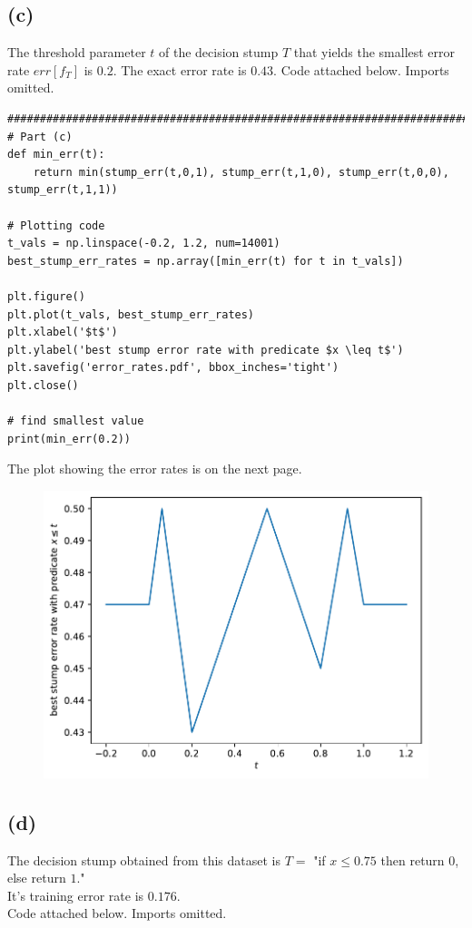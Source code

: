 \documentclass[11pt]{article}
\begin{document}
\subsection*{(c)}
The threshold parameter $t$ of the decision stump $T$ that yields the smallest error rate $err[f_T]$ is $0.2$. The exact error rate is $0.43$. Code attached below. Imports omitted.
\begin{verbatim}
################################################################################
# Part (c)
def min_err(t):
    return min(stump_err(t,0,1), stump_err(t,1,0), stump_err(t,0,0), stump_err(t,1,1))

# Plotting code
t_vals = np.linspace(-0.2, 1.2, num=14001)
best_stump_err_rates = np.array([min_err(t) for t in t_vals])

plt.figure()
plt.plot(t_vals, best_stump_err_rates)
plt.xlabel('$t$')
plt.ylabel('best stump error rate with predicate $x \leq t$')
plt.savefig('error_rates.pdf', bbox_inches='tight')
plt.close()

# find smallest value
print(min_err(0.2))
\end{verbatim}

The plot showing the error rates is on the next page.
\begin{figure}
    \centering
    \includegraphics{images/2c.pdf}
\end{figure}

\newpage
\subsection*{(d)}
The decision stump obtained from this dataset is $T=$ "if $x\leq 0.75$ then return $0$, else return $1$." \\
It's training error rate is $0.176$. \\
Code attached below. Imports omitted.
\end{document}
